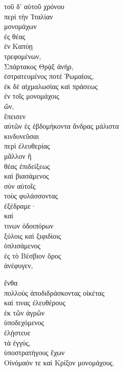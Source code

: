 {\large
\begin{greek}
\noindent  τοῦ δ' αὐτοῦ χρόνου \\
περὶ τὴν Ἰταλίαν \\
μονομάχων \\
\tabto{2em} ἐς θέας \\
\tabto{2em} ἐν Καπύῃ \\
τρεφομένων, \\
Σπάρτακος Θρᾲξ ἀνήρ, \\
\tabto{2em} ἐστρατευμένος ποτὲ Ῥωμαίοις, \\
\tabto{2em} ἐκ δὲ αἰχμαλωσίας καὶ πράσεως \\
\tabto{4em} ἐν τοῖς μονομάχοις \\
\tabto{6em} ὤν, \\
ἔπεισεν \\
\tabto{2em} αὐτῶν ἐς ἑβδομήκοντα ἄνδρας μάλιστα \\
\tabto{2em} κινδυνεῦσαι \\
\tabto{4em} περὶ ἐλευθερίας \\
\tabto{6em} μᾶλλον ἢ \\
\tabto{8em} θέας ἐπιδείξεως \\

καὶ βιασάμενος \\
\tabto{4em} σὺν αὐτοῖς \\
\tabto{2em} τοὺς φυλάσσοντας \\
ἐξέδραμε· \\
καί \\
\tabto{4em} τινων ὁδοιπόρων \\
\tabto{2em} ξύλοις καὶ ξιφιδίοις \\
ὁπλισάμενος \\
\tabto{2em} ἐς τὸ Βέσβιον ὄρος \\
ἀνέφυγεν,

\tabto{2em} ἔνθα \\
\tabto{4em} πολλοὺς ἀποδιδράσκοντας οἰκέτας \\
\tabto{4em} καί τινας ἐλευθέρους \\
\tabto{6em} ἐκ τῶν ἀγρῶν \\
\tabto{2em} ὑποδεχόμενος \\
\tabto{2em} ἐλῄστευε \\
\tabto{4em} τὰ ἐγγύς, \\
\tabto{2em} ὑποστρατήγους ἔχων \\
\tabto{4em} Οἰνόμαόν τε καὶ Κρίξον μονομάχους. \\

\end{greek}
}

